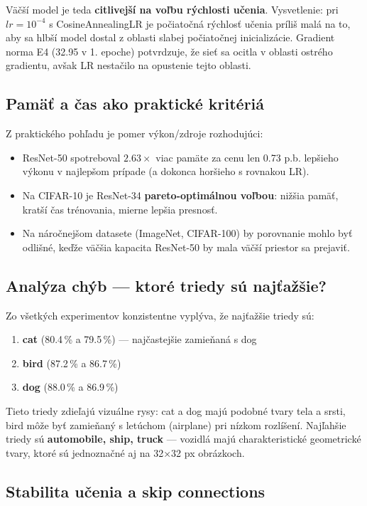 \documentclass[12pt,a4paper]{article}
\begin{document}
Väčší model je teda \textbf{citlivejší na voľbu rýchlosti učenia}. Vysvetlenie:
pri $lr = 10^{-4}$ s CosineAnnealingLR je počiatočná rýchlosť učenia príliš malá
na to, aby sa hlbší model dostal z oblasti slabej počiatočnej inicializácie.
Gradient norma E4 (32.95 v 1. epoche) potvrdzuje, že sieť sa ocitla v oblasti
ostrého gradientu, avšak LR nestačilo na opustenie tejto oblasti.

\subsection{Pamäť a čas ako praktické kritériá}

Z praktického pohľadu je pomer výkon/zdroje rozhodujúci:
\begin{itemize}
  \item ResNet-50 spotreboval $2.63\times$ viac pamäte za cenu len 0.73 p.b.
        lepšieho výkonu v najlepšom prípade (a dokonca horšieho s rovnakou LR).
  \item Na CIFAR-10 je ResNet-34 \textbf{pareto-optimálnou voľbou}: nižšia pamäť,
        kratší čas trénovania, mierne lepšia presnosť.
  \item Na náročnejšom datasete (ImageNet, CIFAR-100) by porovnanie mohlo byť
        odlišné, keďže väčšia kapacita ResNet-50 by mala väčší priestor sa prejaviť.
\end{itemize}

\subsection{Analýza chýb — ktoré triedy sú najťažšie?}

Zo všetkých experimentov konzistentne vyplýva, že najťažšie triedy sú:
\begin{enumerate}
  \item \textbf{cat} (80.4\,\% a 79.5\,\%) — najčastejšie zamieňaná s dog
  \item \textbf{bird} (87.2\,\% a 86.7\,\%)
  \item \textbf{dog} (88.0\,\% a 86.9\,\%)
\end{enumerate}
Tieto triedy zdieľajú vizuálne rysy: cat a dog majú podobné tvary tela a srsti,
bird môže byť zamieňaný s letúchom (airplane) pri nízkom rozlíšení.
Najľahšie triedy sú \textbf{automobile, ship, truck} — vozidlá majú charakteristické
geometrické tvary, ktoré sú jednoznačné aj na 32×32 px obrázkoch.

\subsection{Stabilita učenia a skip connections}
\end{document}

